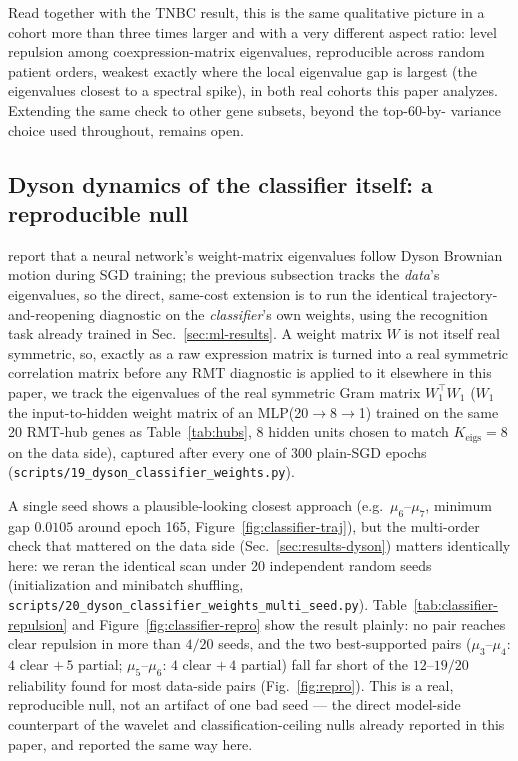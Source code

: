 \documentclass[11pt]{article}
\begin{document}
Read together with the TNBC result, this is the same qualitative
picture in a cohort more than three times larger and with a very
different aspect ratio: level repulsion among coexpression-matrix
eigenvalues, reproducible across random patient orders, weakest exactly
where the local eigenvalue gap is largest (the eigenvalues closest to a
spectral spike), in both real cohorts this paper analyzes.
Extending the same check to other gene subsets, beyond the top-60-by-
variance choice used throughout, remains open.

\subsection{Dyson dynamics of the classifier itself: a reproducible null}
\label{sec:results-dyson-classifier}

\citet{aarts2024} report that a neural network's weight-matrix
eigenvalues follow Dyson Brownian motion during SGD training; the
previous subsection tracks the \emph{data}'s eigenvalues, so the direct,
same-cost extension is to run the identical trajectory-and-reopening
diagnostic on the \emph{classifier}'s own weights, using the recognition
task already trained in Sec.~\ref{sec:ml-results}. A weight matrix $W$
is not itself real symmetric, so, exactly as a raw expression matrix is
turned into a real symmetric correlation matrix before any RMT
diagnostic is applied to it elsewhere in this paper, we track the
eigenvalues of the real symmetric Gram matrix $W_1^\top W_1$ ($W_1$ the
input-to-hidden weight matrix of an MLP(20$\to$8$\to$1) trained on the
same 20 RMT-hub genes as Table~\ref{tab:hubs}, 8 hidden units chosen to
match $K_{\text{eigs}}=8$ on the data side), captured after every one of
300 plain-SGD epochs (\texttt{scripts/19\_dyson\_classifier\_weights.py}).

A single seed shows a plausible-looking closest approach (e.g.\
$\mu_6$--$\mu_7$, minimum gap $0.0105$ around epoch 165,
Figure~\ref{fig:classifier-traj}), but the multi-order check that
mattered on the data side (Sec.~\ref{sec:results-dyson}) matters
identically here: we reran the identical scan under 20 independent
random seeds (initialization and minibatch shuffling,
\texttt{scripts/20\_dyson\_classifier\_weights\_multi\_seed.py}).
Table~\ref{tab:classifier-repulsion} and Figure~\ref{fig:classifier-repro}
show the result plainly: no pair reaches clear repulsion in more than
$4/20$ seeds, and the two best-supported pairs
($\mu_3$--$\mu_4$: $4$ clear $+\,5$ partial; $\mu_5$--$\mu_6$: $4$
clear $+\,4$ partial) fall far short of the $12$--$19/20$ reliability
found for most data-side pairs (Fig.~\ref{fig:repro}). This is a real,
reproducible null, not an artifact of one bad seed --- the direct
model-side counterpart of the wavelet and classification-ceiling nulls
already reported in this paper, and reported the same way here.
\end{document}
